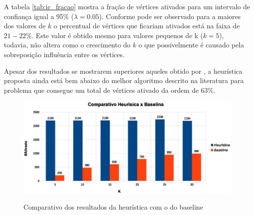 \documentclass[12pt]{article}
\begin{document}
A tabela \ref{tab:ic_fracao} mostra a fração de vértices ativados para um intervalo de confiança igual a 95\% ($\lambda=0.05$){}\cite{jain2008art}. Conforme pode ser observado para a maiores dos valores de $k$ o percentual de vértices que ficariam ativados está na faixa de $21-22\%$. Este valor é obtido mesmo para valores pequenos de k ($k=5$), todavia, não altera como o crescimento do $k$ o que possivelmente é causado pela sobreposição influência entre os vértices.

\begin{table}[h]
\centering
{}
\caption{Intervalo de confiança $\lambda = 0.05$ para a fração de vértices ativados}
\label{tab:ic_fracao}
\end{table}
Apesar dos resultados se mostrarem superiores aqueles obtido por \cite{kempe2003maximizing}, a heurística proposta ainda está bem abaixo do melhor algoritmo descrito na literatura para problema \cite{Hochbaum:1996:ACP:241938.241941} que consegue um total de vértices ativado da ordem de $63\%${}.	
		


\begin{figure}[ht]
	\centering
	\includegraphics[width=6.5in]{../img/grafico_comparativo.eps}
	\label{fig:grafico_comparativo}
	\caption{Comparativo dos resultados da heurística com o do baseline}

\end{figure}
\end{document}
